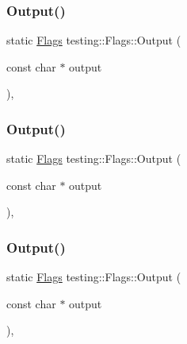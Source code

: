 \mbox{\label{structtesting_1_1_flags_a507916734a6d7ff2dd02891d7849f2d3}} 
\subsubsection{\texorpdfstring{Output()}{Output()}\hspace{0.1cm}{\footnotesize\ttfamily [1/3]}}
{\footnotesize\ttfamily static \mbox{\hyperlink{structtesting_1_1_flags}{Flags}} testing\+::\+Flags\+::\+Output (\begin{DoxyParamCaption}\item[{const char $\ast$}]{output }\end{DoxyParamCaption})\hspace{0.3cm}{\ttfamily [inline]}, {\ttfamily [static]}}

\mbox{\label{structtesting_1_1_flags_a507916734a6d7ff2dd02891d7849f2d3}} 
\subsubsection{\texorpdfstring{Output()}{Output()}\hspace{0.1cm}{\footnotesize\ttfamily [2/3]}}
{\footnotesize\ttfamily static \mbox{\hyperlink{structtesting_1_1_flags}{Flags}} testing\+::\+Flags\+::\+Output (\begin{DoxyParamCaption}\item[{const char $\ast$}]{output }\end{DoxyParamCaption})\hspace{0.3cm}{\ttfamily [inline]}, {\ttfamily [static]}}

\mbox{\label{structtesting_1_1_flags_a507916734a6d7ff2dd02891d7849f2d3}} 
\subsubsection{\texorpdfstring{Output()}{Output()}\hspace{0.1cm}{\footnotesize\ttfamily [3/3]}}
{\footnotesize\ttfamily static \mbox{\hyperlink{structtesting_1_1_flags}{Flags}} testing\+::\+Flags\+::\+Output (\begin{DoxyParamCaption}\item[{const char $\ast$}]{output }\end{DoxyParamCaption})\hspace{0.3cm}{\ttfamily [inline]}, {\ttfamily [static]}}

